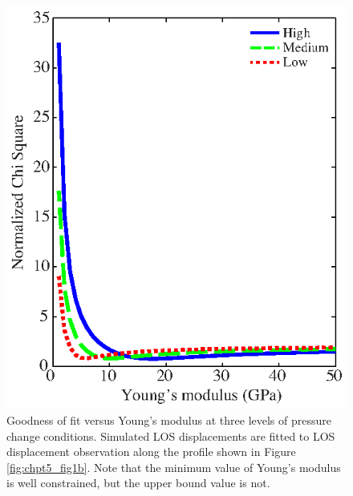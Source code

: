 \clearpage
\begin{figure}
	\centering
	\includegraphics{figs_paper3/Fig9.eps}	
	\caption[Goodness of fit versus Young’s modulus at three levels of pressure change conditions.]{Goodness of fit versus Young’s modulus at three levels of pressure change conditions.  Simulated LOS displacements are fitted to LOS displacement observation along the profile shown in Figure \ref{fig:chpt5_fig1b}.  Note that the minimum value of Young’s modulus is well constrained, but the upper bound value is not.}
	\label{fig:chpt5_fig9}
\end{figure}


